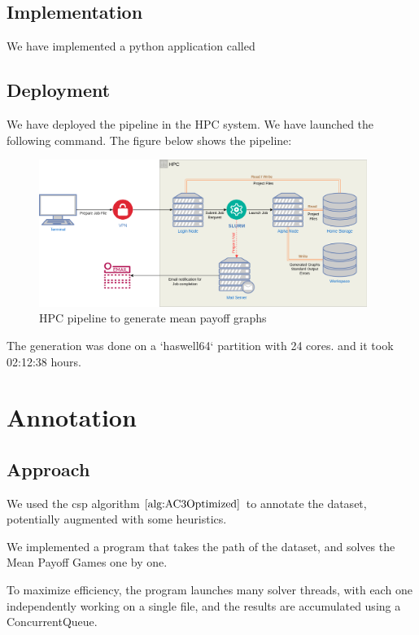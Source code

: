 \subsection{Implementation}
We have implemented a python application called 
\subsection{Deployment}
We have deployed the pipeline in the HPC system. We have launched the following command.
\newline The figure below shows the pipeline:
\begin{figure}[H]
	\centering
	\includegraphics[width=0.95\textwidth]{Figures/DatasetGeneration.png}
	\caption{HPC pipeline to generate mean payoff graphs}
\end{figure}
\FloatBarrier
The generation was done on a `haswell64` partition with 24 cores. and it took 02:12:38 hours.
\newpage
\section{Annotation}
\subsection{Approach}
We used the \acrfull{csp} algorithm $\ref{alg:AC3Optimized}$ to annotate the dataset, potentially augmented with some heuristics.

We implemented a program that takes the path of the dataset, and solves the Mean Payoff Games one by one.

To maximize efficiency, the program launches many solver threads, with each one independently working on a single file, and the results are accumulated using a ConcurrentQueue.
